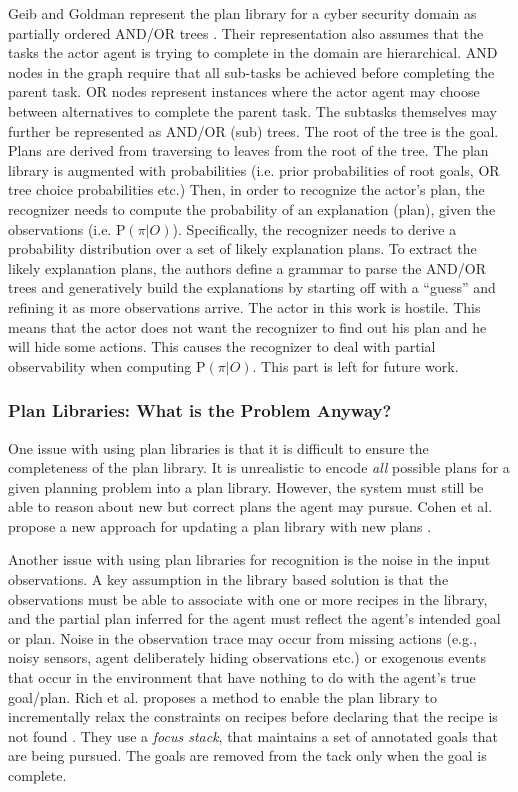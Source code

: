 Geib and Goldman represent the plan library for a cyber security domain as partially ordered AND/OR trees \cite{GeibGoldman09}. Their representation also assumes that the tasks the actor agent is trying to complete in the domain are hierarchical. AND nodes in the graph require that all sub-tasks be achieved before completing the parent task. OR nodes represent instances where the actor agent may choose between alternatives to complete the parent task. The subtasks themselves may further be represented as AND/OR (sub) trees. The root of the tree is the goal. Plans are derived from traversing to leaves from the root of the tree. The plan library is augmented with probabilities (i.e. prior probabilities of root goals, OR tree choice probabilities etc.) Then, in order to recognize the actor's plan, the recognizer needs to compute the probability of an explanation (plan), given the observations (i.e. P$(\pi|O)$). Specifically, the recognizer needs to derive a probability distribution over a set of likely explanation plans. To extract the likely explanation plans, the authors define a grammar to parse the AND/OR trees and generatively build the explanations by starting off with a ``guess'' and refining it as more observations arrive. The actor in this work is hostile. This means that the actor does not want the recognizer to find out his plan and he will hide some actions. This causes the recognizer to deal with partial observability when computing P$(\pi|O)$. This part is left for future work.

\subsubsection{Plan Libraries: What is the Problem Anyway?}
One issue with using plan libraries is that it is difficult to ensure the completeness of the plan library. It is unrealistic to encode \textit{all} possible plans for a given planning problem into a plan library. However, the system must still be able to reason about new but correct plans the agent may pursue. Cohen et al. propose a new approach for updating a plan library with new plans \cite{spencer1993}.

Another issue with using plan libraries for recognition is the noise in the input observations. A key assumption in the library based solution is that the observations must be able to associate with one or more recipes in the library, and the partial plan inferred for the agent must reflect the agent's intended goal or plan. Noise in the observation trace may occur from missing actions (e.g., noisy sensors, agent deliberately hiding observations etc.) or exogenous events that occur in the environment that have nothing to do with the agent's true goal/plan. Rich et al. proposes  a method to enable the plan library to incrementally relax the constraints on recipes before declaring that the recipe is not found \cite{rich2001collagen}. They use a \textit{focus stack}, that maintains a set of annotated goals that are being pursued. The goals are removed from the tack only when the goal is complete.

